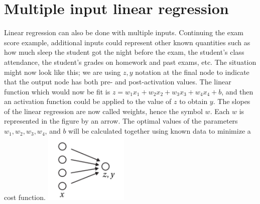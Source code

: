 \documentclass{book}
\theoremstyle{plain}
\theoremstyle{definition}
\numberwithin{exm}{chapter}
\theoremstyle{remark}
\theoremstyle{summary}
\theoremstyle{overview}
\begin{document}
\section*{Multiple input linear regression}
Linear regression can also be done with multiple inputs. Continuing the exam score example, additional inputs could represent other known quantities such as how much sleep the student got the night before the exam, the student's class attendance, the student's grades on homework and past exams, etc. The situation might now look like this; we are using $z, y$ notation at the final node to indicate that the output node has both pre- and post-activation values.
The linear function which would now be fit is $z=w_{1} x_{1}+w_{2} x_{2}+w_{3} x_{3}+w_{4} x_{4}+b$, and then an activation function could be applied to the value of $z$ to obtain $y$. The slopes of the linear regression are now called weights, hence the symbol $w$. Each $w$ is represented in the figure by an arrow. The optimal values of the parameters $w_{1}, w_{2}, w_{3}, w_{4}$, and $b$ will be calculated together using known data to minimize a cost function.
\includegraphics[width=4cm]{page97}
\end{document}
